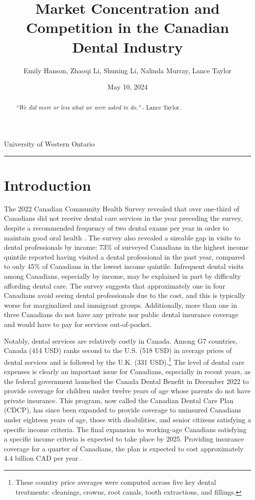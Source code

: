 \documentclass[a4paper,11pt]{article}
\title{\vspace{-1.2cm} Market Concentration and Competition in the Canadian Dental Industry}
\author{Emily Hanson, Zhaoqi Li, Shuning Li, Nalinda Murray, Lance Taylor}
\date{May 10, 2024}
\begin{document}
\maketitle \vspace{-.4 in}
\begin{center}
University of Western Ontario
\rule{\textwidth}{1pt} 
\end{center}




\begin{abstract}
\textit{``We did more or less what we were asked to do."} - Lance Taylor.
\end{abstract}

\section{Introduction}
The 2022 Canadian Community Health Survey revealed that over one-third of Canadians did not receive dental care services in the year preceding the survey, despite a recommended frequency of two dental exams per year in order to maintain good oral health \citep{StatisticsCanada}. The survey also revealed a sizeable gap in visits to dental professionals by income: 73\% of surveyed Canadians in the highest income quintile reported having visited a dental professional in the past year, compared to only 45\% of Canadians in the lowest income quintile. Infrequent dental visits among Canadians, especially by income, may be explained in part by difficulty affording dental care. The survey suggests that approximately one in four Canadians avoid seeing dental professionals due to the cost, and this is typically worse for marginalized and immigrant groups. Additionally, more than one in three Canadians do not have any private nor public dental insurance coverage and would have to pay for services out-of-pocket.

Notably, dental services are relatively costly in Canada. Among G7 countries, Canada (414 USD) ranks second to the U.S. (518 USD) in average prices of dental services \citep{Sankovich} and is followed by the U.K. (331 USD).\footnote{These country price averages were computed across five key dental treatments: cleanings, crowns, root canals, tooth extractions, and fillings.} The level of dental care expenses is clearly an important issue for Canadians, especially in recent years, as the federal government launched the Canada Dental Benefit in December 2022 to provide coverage for children under twelve years of age whose parents do not have private insurance. This program, now called the Canadian Dental Care Plan (CDCP), has since been expanded to provide coverage to uninsured Canadians under eighteen years of age, those with disabilities, and senior citizens satisfying a specific income criteria. The final expansion to working-age Canadians satisfying a specific income criteria is expected to take place by 2025. Providing insurance coverage for a quarter of Canadians, the plan is expected to cost approximately 4.4 billion CAD per year \citep{Rachini}.
\end{document}
